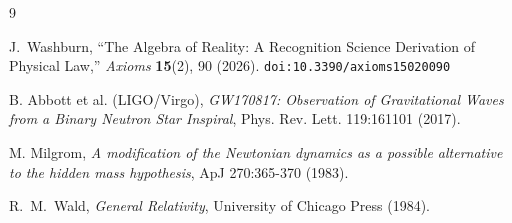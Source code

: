 \documentclass[12pt,a4paper]{article}
\theoremstyle{definition}
\theoremstyle{remark}
\begin{document}
\begin{thebibliography}{9}

J.~Washburn, ``The Algebra of Reality: A Recognition Science Derivation
of Physical Law,'' \emph{Axioms} \textbf{15}(2), 90 (2026).
\texttt{doi:10.3390/axioms15020090}

 B. Abbott et al. (LIGO/Virgo), \emph{GW170817: Observation of 
Gravitational Waves from a Binary Neutron Star Inspiral}, 
Phys. Rev. Lett. 119:161101 (2017).

 M. Milgrom, \emph{A modification of the Newtonian dynamics as a 
possible alternative to the hidden mass hypothesis}, ApJ 270:365-370 (1983).

R.~M.~Wald, \emph{General Relativity}, University of Chicago Press (1984).

\end{thebibliography}
\end{document}
